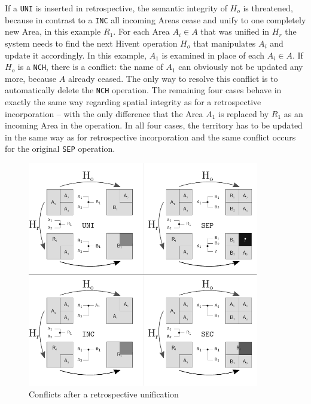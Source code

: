 If a \texttt{UNI} is inserted in retrospective, the semantic integrity of $H_o$ is threatened, because in contrast to a \texttt{INC} all incoming Areas cease and unify to one completely new Area, in this example $R_1$. For each Area $A_i \in A$ that was unified in $H_r$ the system needs to find the next Hivent operation $H_o$ that manipulates $A_i$ and update it accordingly. In this example, $A_1$ is examined in place of each $A_i \in A$. If $H_o$ is a \texttt{NCH}, there is a conflict: the name of $A_1$ can obviously not be updated any more, because $A$ already ceased. The only way to resolve this conflict is to automatically delete the \texttt{NCH} operation. The remaining four cases behave in exactly the same way regarding spatial integrity as for a retrospective incorporation -- with the only difference that the Area $A_1$ is replaced by $R_1$ as an incoming Area in the operation. In all four cases, the territory has to be updated in the same way as for retrospective incorporation and the same conflict occurs for the original \texttt{SEP} operation.

\begin{figure}[ht]
\vspace{1em}
  \centering
  \includegraphics[width=0.9\textwidth]{graphics/development/editing_hivent_data/retrospective_updates/UNI}
  \caption{Conflicts after a retrospective unification}
  \label{fig:update_conflict_UNI}
\end{figure}


